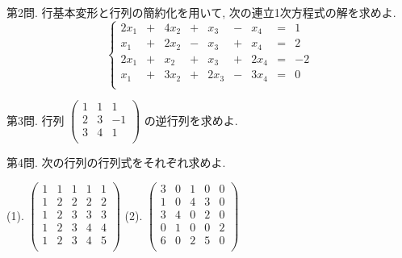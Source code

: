\documentclass[dvipdfmx,a4paper,11pt]{article}
\theoremstyle{definition}
\begin{document}
 
  \vspace{11pt}
{\Large 第2問.}  行基本変形と行列の簡約化を用いて, 次の連立1次方程式の解を求めよ.
 $$
 \left\{ 
\begin{matrix}
 2 x_1&+ &4x_2 &  +& x_3&- &x_4&= & 1\\
x_1&+&2x_2& -&x_3&+&x_4&= & 2\\
2x_1&+ &x_2& + &x_3&+&2x_4&=&-2 \\
 x_1&+ &3x_2& + &2x_3&-&3x_4&=&0 \\
\end{matrix}
\right.
 $$
 
   \vspace{11pt}
{\Large 第3問.} 
行列
$ \begin{pmatrix}
1&1&1\\
2&3&-1\\
3&4&1 \\
\end{pmatrix}
 $
の逆行列を求めよ. 

  \vspace{11pt}
{\Large 第4問.} 
 次の行列の行列式をそれぞれ求めよ. 
  
 (1). 
 $
 \begin{pmatrix}
1& 1& 1&1&1\\
 1& 2  & 2&2&2\\
1& 2 & 3&3&3\\
1& 2& 3&4&4\\
1& 2& 3&4&5\\
 \end{pmatrix}
 $ 
   (2). 
 $
 \begin{pmatrix}
   3& 0& 1& 0&0\\
  1& 0& 4& 3&0\\
  3& 4& 0  & 2&0\\
  0& 1& 0 & 0&2\\
  6& 0& 2 & 5&0\\
 \end{pmatrix}
  $
 
\end{document}
